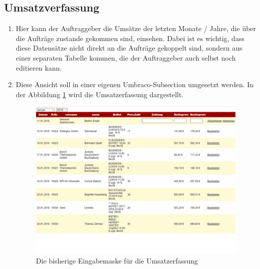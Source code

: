 \subsection{Umsatzverfassung}
\begin{enumerate}
	\item Hier kann der Auftraggeber die Umsätze der letzten Monate / Jahre, die über die Aufträge zustande gekommen sind, einsehen. Dabei ist es wichtig, dass diese Datensätze nicht direkt an die Aufträge gekoppelt sind, sondern aus einer separaten Tabelle kommen, die der Auftraggeber auch selbst noch editieren kann.
	\item Diese Ansicht soll in einer eigenen Umbraco-Subsection umgesetzt werden.
	In der Abbildung \ref{fig:Umsatzerfassung} wird die Umsatzerfassung dargestellt.
	
		\begin{figure}[h]
		\centering
		\includegraphics[width=0.6\linewidth]{Graphics/umsatzErfassung.png}
		\caption[Uebersicht]{Die bisherige Eingabemaske für die Umsatzerfassung}
		\label{fig:Umsatzerfassung}
	\end{figure}
	
\end{enumerate} 


